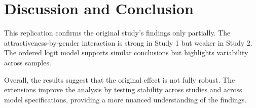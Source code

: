\documentclass[12pt]{article}
\begin{document}
	\section{Discussion and Conclusion}
	This replication confirms the original study’s findings only partially. The attractiveness-by-gender interaction is strong in Study 1 but weaker in Study 2. The ordered logit model supports similar conclusions but highlights variability across samples.
	
	Overall, the results suggest that the original effect is not fully robust. The extensions improve the analysis by testing stability across studies and across model specifications, providing a more nuanced understanding of the findings.
	
\end{document}
